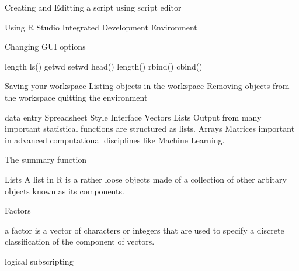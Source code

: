\documentclass[a4paper,12pt]{article}
\begin{document}
Creating and Editting a script using script editor

Using R Studio Integrated Development Environment

Changing GUI options

length
ls()
getwd
setwd
head()
length()
rbind()
cbind()



Saving your workspace
Listing objects in the workspace
Removing objects from the workspace
quitting the environment

data entry
Spreadsheet Style Interface
Vectors
Lists
Output from many important statistical functions are structured as lists.
Arrays
Matrices important in advanced computational disciplines like Machine Learning.

 
The summary function


Lists
A list in R is a rather loose objects made of a collection of other arbitary objects known as its components. 








Factors

a factor is a vector of characters or integers that are used to specify a discrete classification of the component of vectors.

logical subscripting
\end{document}
